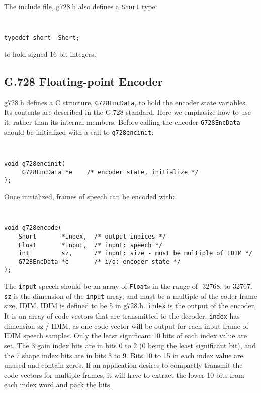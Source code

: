 The include file, g728.h also defines a {\tt Short} type:

{\tt\small
\begin{verbatim}
typedef short  Short;
\end{verbatim}
}

to hold signed 16-bit integers.

\subsection {G.728 Floating-point Encoder}

g728.h defines a C structure, {\tt G728EncData}, to hold the encoder
state variables. Its contents are described in the G.728 standard.
Here we emphasize how to use it, rather than
its internal members. Before calling the encoder
{\tt G728EncData} should be initialized with a call to {\tt g728encinit}:

{\tt\small
\begin{verbatim}
void g728encinit(
     G728EncData *e    /* encoder state, initialize */
);
\end{verbatim}
}

Once initialized, frames of speech can be encoded with:

{\tt\small
\begin{verbatim}
void g728encode(
    Short       *index,  /* output indices */
    Float       *input,  /* input: speech */
    int	        sz,      /* input: size - must be multiple of IDIM */
    G728EncData *e       /* i/o: encoder state */	
);
\end{verbatim}
}

The {\tt input} speech should be an array of {\tt Float}s in the range of
-32768. to 32767. {\tt sz} is the dimension of the {\tt input} array,
and must be a multiple of the coder frame size, IDIM.
IDIM is defined to be 5 in g728.h.
{\tt index} is the output of the encoder. It is an array of code vectors
that are transmitted to the decoder.
{\tt index} has dimension sz / IDIM, as one
code vector will be output for each input frame of IDIM speech samples.
Only the least significant 10 bits of each index value are set.
The 3 gain index bits are in bits 0 to 2 (0 being the least
significant bit), and the 7 shape index bits are in bits 3 to 9.
Bits 10 to 15 in each index value are unused and contain zeros.
If an application desires to compactly transmit the
code vectors for multiple frames, it will have to extract the lower 10 bits
from each index word and pack the bits.

